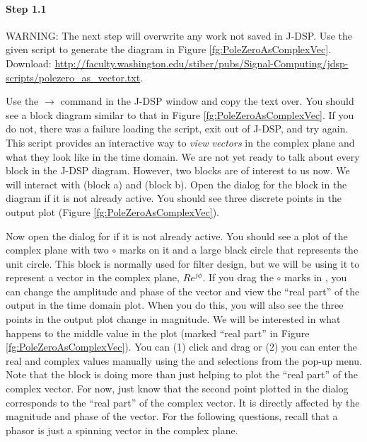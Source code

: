 \paragraph{Step 1.1} 
WARNING: The next step will overwrite any work not saved in J-DSP. Use the given script to generate the diagram in Figure \ref{fg:PoleZeroAsComplexVec}. Download: \url{http://faculty.washington.edu/stiber/pubs/Signal-Computing/jdsp-scripts/polezero_as_vector.txt}.

Use the  $\rightarrow$ command in the J-DSP window and copy the text  over. You should see a block diagram similar to that in Figure \ref{fg:PoleZeroAsComplexVec}. If you do not, there was a failure loading the script, exit out of J-DSP, and try again. 
This script provides an interactive way to \textit{view vectors} in the complex plane and what they look like in the time domain. We are not yet ready to talk about every block in the J-DSP diagram. However, two blocks are of interest to us now. We will interact with  (block a) and  (block b). Open the dialog for the  block in the diagram if it is not already active. You should see three discrete points in the output plot (Figure \ref{fg:PoleZeroAsComplexVec}). 

Now open the dialog for  if it is not already active. You should see a plot of the complex plane with two $\circ$ marks on it and a large black circle that represents the unit circle. This  block is normally used for filter design, but we will be using it to represent a vector in the complex plane, $Re^{j\phi}$. If you drag the $\circ$ marks in , you can change the amplitude and phase of the vector and view the ``real part'' of the output in the time domain plot. When you do this, you will also see the three points in the output plot change in magnitude. We will be interested in what happens to the middle value in the plot (marked ``real part'' in Figure \ref{fg:PoleZeroAsComplexVec}). You can (1) click and drag or (2) you can enter the real and complex values manually using the  and  selections from the pop-up menu. 
Note that the  block is doing more than just helping to plot the ``real part'' of the complex vector. For now, just know that the second point plotted in the  dialog corresponds to the ``real part''  of the complex vector. It is directly affected by the magnitude and phase of the vector. For the following questions, recall that a phasor is just a spinning vector in the complex plane.  

